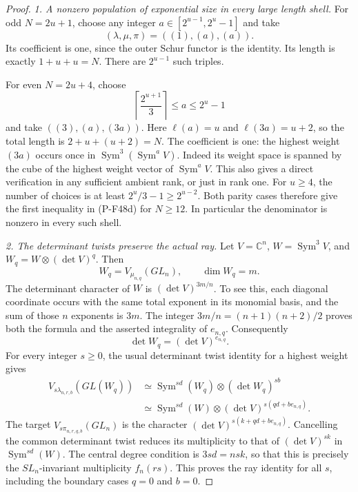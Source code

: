 \begin{proof}
\emph{1. A nonzero population of exponential size in every
large length shell.}
For odd $N=2u+1$, choose any integer
$a\in[2^{u-1},2^u-1]$ and take
\[
                         (\lambda,\mu,\pi)=((1),(a),(a)).
\]
Its coefficient is one, since the outer Schur functor is
the identity. Its length is exactly $1+u+u=N$.
There are $2^{u-1}$ such triples.

For even $N=2u+4$, choose
\[
                    \left\lceil\frac{2^{u+1}}3\right\rceil
                              \le a\le 2^u-1
\]
and take $((3),(a),(3a))$. Here $\ell(a)=u$ and
$\ell(3a)=u+2$, so the total length is $2+u+(u+2)=N$.
The coefficient is one: the highest weight $(3a)$ occurs
once in $\operatorname{Sym}^3(\operatorname{Sym}^a V)$.
Indeed its weight space is spanned by the cube of the
highest weight vector of $\operatorname{Sym}^a V$.
This also gives a direct verification in any sufficient
ambient rank, or just in rank one.
For $u\ge4$, the number of choices is at least
$2^u/3-1\ge2^{u-2}$.
Both parity cases therefore give the first inequality in
(P-F48d) for $N\ge12$. In particular the denominator is
nonzero in every such shell.

\emph{2. The determinant twists preserve the actual ray.}
Let $V=\mathbb C^n$, $W=\operatorname{Sym}^3 V$, and
$W_q=W\otimes(\det V)^q$. Then
\[
              W_q=V_{\mu_{n,q}}(GL_n),\qquad \dim W_q=m.
\]
The determinant character of $W$ is
$(\det V)^{3m/n}$. To see this, each diagonal coordinate
occurs with the same total exponent in its monomial
basis, and the sum of those $n$ exponents is $3m$.
The integer $3m/n=(n+1)(n+2)/2$ proves both the formula
and the asserted integrality of $e_{n,q}$.
Consequently
\[
                    \det W_q=(\det V)^{e_{n,q}}.
\]
For every integer $s\ge0$, the usual determinant twist
identity for a highest weight gives
\[
 \begin{split}
 V_{s\lambda_{n,r,b}}(GL(W_q))
   &\simeq \operatorname{Sym}^{sd}(W_q)
                          \otimes(\det W_q)^{sb}\\
   &\simeq \operatorname{Sym}^{sd}(W)
                    \otimes(\det V)^{s(qd+be_{n,q})}.
 \end{split}
 \tag{P-F48e}
\]
The target $V_{s\pi_{n,r,q,b}}(GL_n)$ is the character
$(\det V)^{s(k+qd+be_{n,q})}$. Cancelling the common
determinant twist reduces its multiplicity to that of
$(\det V)^{sk}$ in $\operatorname{Sym}^{sd}(W)$.
The central degree condition is $3sd=nsk$, so that
this is precisely the $SL_n$-invariant multiplicity
$f_n(rs)$. This proves the ray identity for all $s$,
including the boundary cases $q=0$ and $b=0$.


\end{proof}
